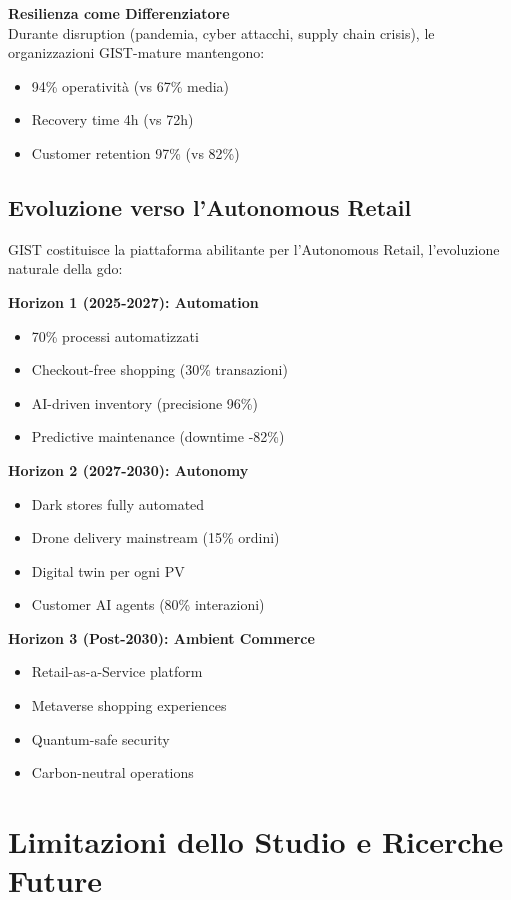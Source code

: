 \textbf{Resilienza come Differenziatore}\\
Durante disruption (pandemia, cyber attacchi, supply chain crisis), le organizzazioni GIST-mature mantengono:
\begin{itemize}
\item 94\% operatività (vs 67\% media)
\item Recovery time 4h (vs 72h)
\item Customer retention 97\% (vs 82\%)
\end{itemize}

\subsection{\texorpdfstring{Evoluzione verso l'Autonomous Retail}{5.5.2 - Autonomous Retail}}
\label{subsec:5.5.2}

GIST costituisce la piattaforma abilitante per l'Autonomous Retail, l'evoluzione naturale della \gls{gdo}:

\textbf{Horizon 1 (2025-2027): Automation}
\begin{itemize}
\item 70\% processi automatizzati
\item Checkout-free shopping (30\% transazioni)
\item AI-driven inventory (precisione 96\%)
\item Predictive maintenance (downtime -82\%)
\end{itemize}

\textbf{Horizon 2 (2027-2030): Autonomy}
\begin{itemize}
\item Dark stores fully automated
\item Drone delivery mainstream (15\% ordini)
\item Digital twin per ogni PV
\item Customer AI agents (80\% interazioni)
\end{itemize}

\textbf{Horizon 3 (Post-2030): Ambient Commerce}
\begin{itemize}
\item Retail-as-a-Service platform
\item Metaverse shopping experiences
\item Quantum-safe security
\item Carbon-neutral operations
\end{itemize}


\section{Limitazioni dello Studio e Ricerche Future}

